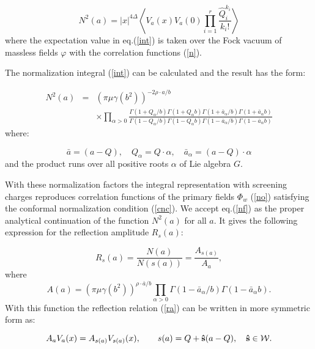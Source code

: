 \documentclass[a4paper,12pt]{article}
\begin{document}
\begin{equation}
N^2(a)=\left| x\right| ^{4\Delta }\left\langle V_a(x)V_a(0)\prod_{i=1}^r
\frac{\hat{Q}_i^{k_i}}{k_i!}\right\rangle  \label{int}
\end{equation}
where the expectation value in eq.(\ref{int}) is taken over the Fock vacuum
of massless fields $\varphi $ with the correlation functions (\ref{n}).

The normalization integral (\ref{int}) can be calculated and the result has
the form:

\begin{eqnarray}
N^2(a)&=&(\pi \mu \gamma (b^2))^{-2\rho \cdot a/b}
\nonumber \\
&&\times
\prod_{\alpha >0}\frac{
\Gamma (1+Q_\alpha /b)\Gamma (1+Q_\alpha b)\Gamma (1+\bar{a}_\alpha
/b)\Gamma (1+\bar{a}_\alpha b)}{\Gamma (1-Q_\alpha /b)\Gamma (1-Q_\alpha
b)\Gamma (1-\bar{a}_\alpha /b)\Gamma (1-\bar{a}_\alpha b)}  \label{nf}
\end{eqnarray}
where:

\begin{equation}
\bar{a}=(a-Q),\quad Q_\alpha =Q\cdot \alpha ,\quad \bar{a}_\alpha
=(a-Q)\cdot \alpha  \label{abar}
\end{equation}
and the product runs over all positive roots $\alpha $ of Lie algebra 
$G.$

With these normalization factors the integral representation with screening
charges \cite{FL} reproduces correlation functions 
of the primary fields $\Phi _w$ (\ref{no})
satisfying the conformal normalization condition (\ref{cnc}). We accept 
eq.(\ref{nf}) as the proper analytical continuation of the function $N^2(a)$ 
for all $a$. It gives the following expression for the reflection amplitude 
$R_s(a):$

\begin{equation}
R_s(a)=\frac{N(a)}{N(s(a))}=\frac{A_{s(a)}}{A_a},  \label{rsa}
\end{equation}
where 
\begin{equation}
A(a)=(\pi \mu \gamma (b^2))^{\rho \cdot \bar{a}/b}\prod_{\alpha >0}\Gamma (1-
\bar{a}_\alpha /b)\Gamma (1-\bar{a}_\alpha b).  \label{amp}
\end{equation}
With this function the reflection relation (\ref{ra}) can be written in more
symmetric form as:

\begin{equation}
A_aV_a(x)=A_{s(a)}V_{s(a)}(x),\qquad s(a)=Q+{\bf \hat{s}}(a-Q),\quad {\bf 
\hat{s}}\in {\cal W}.  \label{rere}
\end{equation}
\end{document}
